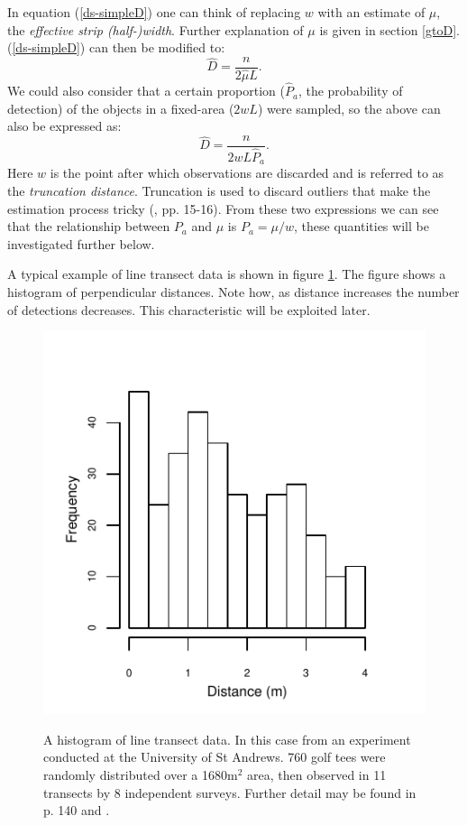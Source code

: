In equation (\ref{ds-simpleD}) one can think of replacing $w$ with an estimate of $\mu$, the \textit{effective strip (half-)width}. Further explanation of $\mu$ is given in section \ref{gtoD}. (\ref{ds-simpleD}) can then be modified to:
\begin{equation}
\hat{D}=\frac{n}{2\hat{\mu}L}.
\label{ds-D}
\end{equation}
We could also consider that a certain proportion ($\hat{P}_a$, the probability of detection) of the objects in a fixed-area ($2wL$) were sampled, so the above can also be expressed as:
\begin{equation*}
\hat{D}=\frac{n}{2wL\hat{P}_a}.
\end{equation*}
Here $w$ is the point after which observations are discarded and is referred to as the \textit{truncation distance}. Truncation is used to discard outliers that make the estimation process tricky (\cite{IDS}, pp. 15-16). From these two expressions we can see that the relationship between $P_a$ and $\mu$ is $P_a=\mu/w$, these quantities will be investigated further below.

A typical example of line transect data is shown in figure \ref{ds-lt-example}. The figure shows a histogram of perpendicular distances. Note how, as distance increases the number of detections decreases. This characteristic will be exploited later.

\begin{figure}
\centering
\includegraphics{intro/figs/ds-golftee.pdf}\\
\caption{A histogram of line transect data. In this case from an experiment conducted at the University of St Andrews. 760 golf tees were randomly distributed over a 1680m$^2$ area, then observed in 11 transects by 8 independent surveys. Further detail may be found in  p. 140 and .}
\label{ds-lt-example}
\end{figure}

